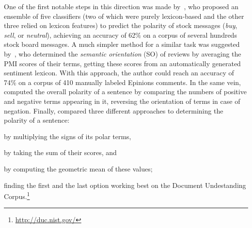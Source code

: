 One of the first notable steps in this direction was made
by~\citet{Das:01}, who proposed an ensemble of five classifiers (two
of which were purely lexicon-based and the other three relied on
lexicon features) to predict the polarity of stock messages
(\emph{buy}, \emph{sell}, or \emph{neutral}), achieving an accuracy of
62\% on a corpus of several hundreds stock board messages.  A much
simpler method for a similar task was suggested by~\citet{Turney:02},
who determined the \emph{semantic orientation} (SO) of reviews by
averaging the PMI scores of their terms, getting these scores from an
automatically generated sentiment lexicon.  With this approach, the
author could reach an accuracy of 74\% on a corpus of 410 manually
labeled Epinions comments.  In the same vein, \citet{Hu:04} computed
the overall polarity of a sentence by comparing the numbers of
positive and negative terms appearing in it, reversing the orientation
of terms in case of negation.  Finally, \citet{Kim:04} compared three
different approaches to determining the polarity of a sentence:
\begin{inparaenum}[(i)]
\item by multiplying the signs of its polar terms,
\item by taking the sum of their scores, and
\item by computing the geometric mean of these values;
\end{inparaenum}
finding the first and the last option working best on the Document
Undestanding Corpus.\footnote{\url{http://duc.nist.gov/}}



